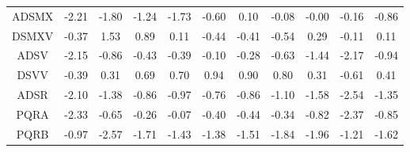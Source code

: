 \documentclass[11pt,a4paper]{report}
\begin{document}
\begin{longtable}{ | c || c | c | c | c | c | c | c | c | c || c |}
ADSMX &  \cellcolor[HTML]{FFC7C7} -2.21 &  \cellcolor[HTML]{FFCFCF} -1.80 &  \cellcolor[HTML]{FFDFDF} -1.24 &  \cellcolor[HTML]{FFD7D7} -1.73 &  \cellcolor[HTML]{FFEFEF} -0.60 &  \cellcolor[HTML]{FFFFFF} 0.10 &  \cellcolor[HTML]{FFFFFF} -0.08 &  \cellcolor[HTML]{FFFFFF} -0.00 &  \cellcolor[HTML]{FFFFFF} -0.16 &  \cellcolor[HTML]{FFE7E7} -0.86 \\
DSMXV &  \cellcolor[HTML]{FFF7F7} -0.37 &  \cellcolor[HTML]{D7D7FF} 1.53 &  \cellcolor[HTML]{E7E7FF} 0.89 &  \cellcolor[HTML]{FFFFFF} 0.11 &  \cellcolor[HTML]{FFF7F7} -0.44 &  \cellcolor[HTML]{FFF7F7} -0.41 &  \cellcolor[HTML]{FFEFEF} -0.54 &  \cellcolor[HTML]{F7F7FF} 0.29 &  \cellcolor[HTML]{FFFFFF} -0.11 &  \cellcolor[HTML]{FFFFFF} 0.11 \\
ADSV &  \cellcolor[HTML]{FFC7C7} -2.15 &  \cellcolor[HTML]{FFE7E7} -0.86 &  \cellcolor[HTML]{FFF7F7} -0.43 &  \cellcolor[HTML]{FFF7F7} -0.39 &  \cellcolor[HTML]{FFFFFF} -0.10 &  \cellcolor[HTML]{FFF7F7} -0.28 &  \cellcolor[HTML]{FFEFEF} -0.63 &  \cellcolor[HTML]{FFD7D7} -1.44 &  \cellcolor[HTML]{FFC7C7} -2.17 &  \cellcolor[HTML]{FFE7E7} -0.94 \\
DSVV &  \cellcolor[HTML]{FFF7F7} -0.39 &  \cellcolor[HTML]{F7F7FF} 0.31 &  \cellcolor[HTML]{EFEFFF} 0.69 &  \cellcolor[HTML]{EFEFFF} 0.70 &  \cellcolor[HTML]{E7E7FF} 0.94 &  \cellcolor[HTML]{E7E7FF} 0.90 &  \cellcolor[HTML]{E7E7FF} 0.80 &  \cellcolor[HTML]{F7F7FF} 0.31 &  \cellcolor[HTML]{FFEFEF} -0.61 &  \cellcolor[HTML]{F7F7FF} 0.41 \\
ADSR &  \cellcolor[HTML]{FFC7C7} -2.10 &  \cellcolor[HTML]{FFDFDF} -1.38 &  \cellcolor[HTML]{FFE7E7} -0.86 &  \cellcolor[HTML]{FFE7E7} -0.97 &  \cellcolor[HTML]{FFEFEF} -0.76 &  \cellcolor[HTML]{FFE7E7} -0.86 &  \cellcolor[HTML]{FFE7E7} -1.10 &  \cellcolor[HTML]{FFD7D7} -1.58 &  \cellcolor[HTML]{FFBFBF} -2.54 &  \cellcolor[HTML]{FFDFDF} -1.35 \\
PQRA &  \cellcolor[HTML]{FFC7C7} -2.33 &  \cellcolor[HTML]{FFEFEF} -0.65 &  \cellcolor[HTML]{FFF7F7} -0.26 &  \cellcolor[HTML]{FFFFFF} -0.07 &  \cellcolor[HTML]{FFF7F7} -0.40 &  \cellcolor[HTML]{FFF7F7} -0.44 &  \cellcolor[HTML]{FFF7F7} -0.34 &  \cellcolor[HTML]{FFE7E7} -0.82 &  \cellcolor[HTML]{FFC7C7} -2.37 &  \cellcolor[HTML]{FFE7E7} -0.85 \\
PQRB &  \cellcolor[HTML]{FFE7E7} -0.97 &  \cellcolor[HTML]{FFBFBF} -2.57 &  \cellcolor[HTML]{FFD7D7} -1.71 &  \cellcolor[HTML]{FFD7D7} -1.43 &  \cellcolor[HTML]{FFDFDF} -1.38 &  \cellcolor[HTML]{FFD7D7} -1.51 &  \cellcolor[HTML]{FFCFCF} -1.84 &  \cellcolor[HTML]{FFCFCF} -1.96 &  \cellcolor[HTML]{FFDFDF} -1.21 &  \cellcolor[HTML]{FFD7D7} -1.62 \\

\end{longtable}
\end{document}
